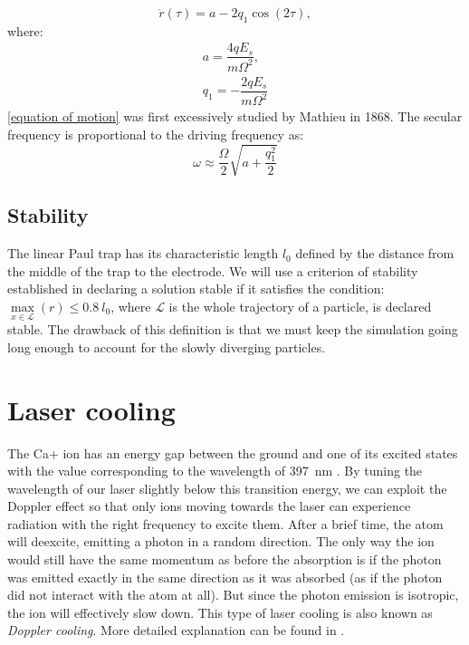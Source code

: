 \begin{equation}
	\label{eq:mathieu equation}
	\ddot{r}(\tau) = a - 2 q_1 \cos(2 \tau),
\end{equation}
where:
\begin{subequations}
\begin{align}
	a = \dfrac{4 q E_s}{m \Omega^2}, \\
	q_1 = -\dfrac{2 q E_s}{m \Omega^2}
\end{align}
\end{subequations}
 \eqref{equation of motion} was first excessively studied by Mathieu in 1868. The secular frequency is proportional to the driving frequency as:
\begin{equation}
	\omega \approx \frac{\Omega}{2} \sqrt{a + \frac{q_1^2}{2}}
\end{equation}

\subsection{Stability}

The linear Paul trap has its characteristic length $l_0$ defined by the distance from the middle of the trap to the electrode. We will use a criterion of stability established in \cite{gerlich1992inhomogeneous} declaring a solution stable if it satisfies the condition: \\ $\max\limits_{x \in \mathcal{L}}(r) \leq 0.8 \ l_0$, where $\mathcal{L}$ is the whole trajectory of a particle, is declared stable. The drawback of this definition is that we must keep the simulation going long enough to account for the slowly diverging particles.

\section{Laser cooling} 

The Ca+ ion has an energy gap between the ground and one of its excited states with the value corresponding to the wavelength of \SI{397}{\nano\meter} \cite{urabe1993laser}. By tuning the wavelength of our laser slightly below this transition energy, we can exploit the Doppler effect so that only ions moving towards the laser can experience radiation with the right frequency to excite them. After a brief time, the atom will deexcite, emitting a photon in a random direction. The only way the ion would still have the same momentum as before the absorption is if the photon was emitted exactly in the same direction  as it was absorbed (as if the photon did not interact with the atom at all). But since the photon emission is isotropic, the ion will effectively slow down. This type of laser cooling is also known as \emph{Doppler cooling}. More detailed explanation can be found in \cite{alma990008711500106986}.  
 
